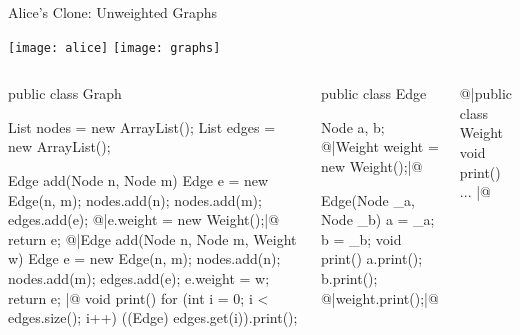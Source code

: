 \begin{frame}[fragile]{Alice's Clone: Unweighted Graphs}
	\vspace{-1.2cm}
	\begin{flushright}
		\texttt{[image: alice]}
		\texttt{[image: graphs]}
	\end{flushright}
	\begin{tiny}
		\begin{columns}
				\vspace{-15mm}				
\vspace{3mm}
\begin{codetight}{}
public class Graph {
	List nodes = new ArrayList();
	List edges = new ArrayList();

	Edge add(Node n, Node m) {
		Edge e = new Edge(n, m);
		nodes.add(n); nodes.add(m); edges.add(e);
		@|e.weight = new Weight();|@
		return e;
	}
	@|Edge add(Node n, Node m, Weight w) {
		Edge e = new Edge(n, m);
		nodes.add(n); nodes.add(m); edges.add(e);
		e.weight = w;
		return e;
	}|@
	void print() {
		for (int i = 0; i < edges.size(); i++) {
			((Edge) edges.get(i)).print();
		}
	}
}
\end{codetight}
\begin{codetight}{}
public class Edge {
	Node a, b;
	@|Weight weight = new Weight();|@

	Edge(Node _a, Node _b) {
		a = _a; b = _b;
	}
	void print() {
		a.print(); b.print();
		@|weight.print();|@
	}
}
\end{codetight}
\begin{codetight}{}
@|public class Weight {
	void print() {...}
}|@
\end{codetight}
		\end{columns}
	\end{tiny}
\end{frame}

